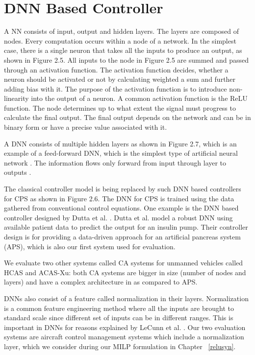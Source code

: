 \section{DNN Based Controller}
\label{apsdnn}


A \ac{NN} consists of input, output and hidden layers. 
The layers are composed of nodes. Every computation occurs within a node of a network.
In the simplest case, there is a single neuron that takes all the inputs to produce an output, as shown in Figure 2.5. 
All inputs to the node in Figure 2.5 are summed and  passed through an activation function. 
The activation function decides, whether a neuron should be activated or not by calculating weighted a sum and further adding bias with it. The purpose of the activation function is to introduce non-linearity into the output of a neuron.
A common activation function is the \ac{ReLU} function. 
The node determines up to what extent the signal must progress to calculate the final output. 
The final output depends on the network and can be in binary form or have a precise value associated with it. 


A \ac{DNN} consists of multiple hidden layers as shown in Figure 2.7, which is an example of a feed-forward \ac{DNN}, which is the simplest type of artificial neural network \cite{feedforward}.
The information flows only forward from input through layer to outputs \cite{Zell}. 

The classical controller model is being replaced by such DNN based controllers for CPS as shown in  Figure 2.6.
The \ac{DNN} for \ac*{CPS} is trained using the data gathered from conventional control equations. 
One example is the DNN based controller designed by Dutta et al. \cite{Dutta_Others__2018__Robust}. 
Dutta et al. model a robust DNN using available patient data to predict the output for an insulin pump.
Their controller design is for providing a data-driven approach for an artificial pancreas system (APS), which is also our first system used for evaluation. 

We evaluate two other systems called \ac{CA} systems for unmanned vehicles \cite{7778055} called \ac{HCAS} and \ac{ACAS-Xu}: both \ac{CA} systems are bigger in size (number of nodes and layers) and have a complex architecture in as compared to \ac{APS}.


\ac{DNN}s also consist of a feature called normalization in their layers.  
Normalization is a common feature engineering method where all the inputs are brought to standard scale since different set of inputs can be in different ranges. 
This is important in \ac{DNN}s for reasons explained by  LeCunn et al.  \cite{10.5555/645754.668382}.
Our two evaluation systems are aircraft  control management systems \cite{10.1007/978-3-319-63387-9_5} which include a normalization layer, 
which we consider during our \ac{MILP} formulation in Chapter ~\ref{relusyn}.


